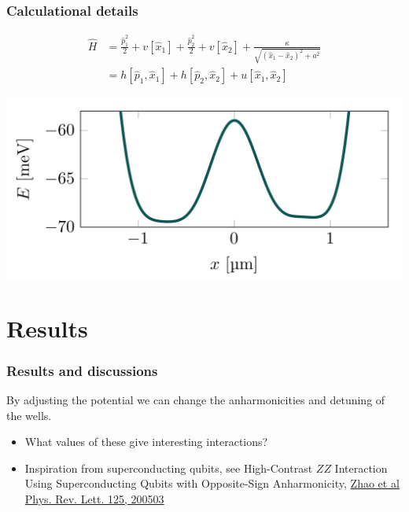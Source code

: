 \documentclass{beamer}
\begin{document}
\begin{frame}
\frametitle{Calculational details}

\begin{align}
\hat{H} &= \frac{\hat{p}_1^2}{2} + v[\hat{x}_1] + \frac{\hat{p}_2^2}{2} + v[\hat{x}_2] + \frac{\kappa}{\sqrt{(\hat{x}_1-\hat{x}_2)^2 + a^2}}\\
&= h[\hat{p}_1,\hat{x}_1] + h[\hat{p}_2,\hat{x}_2] + u[\hat{x}_1,\hat{x}_2]
\end{align}

\vspace{6mm}

\centerline{\includegraphics[width=0.8\linewidth]{qcfigures/wells.png}}

\vspace{6mm}
\end{frame}

\section{Results}



\begin{frame}
\frametitle{Results and discussions}

By adjusting the potential we can change the anharmonicities and detuning of the wells.
\begin{itemize}
\item What values of these give interesting interactions?

\item Inspiration from superconducting qubits, see High-Contrast $ZZ$ Interaction Using Superconducting Qubits with Opposite-Sign Anharmonicity, \href{{https://journals.aps.org/prl/abstract/10.1103/PhysRevLett.125.200503}}{Zhao et al Phys. Rev. Lett. 125, 200503}
\end{itemize}

\noindent
\end{frame}
\end{document}
